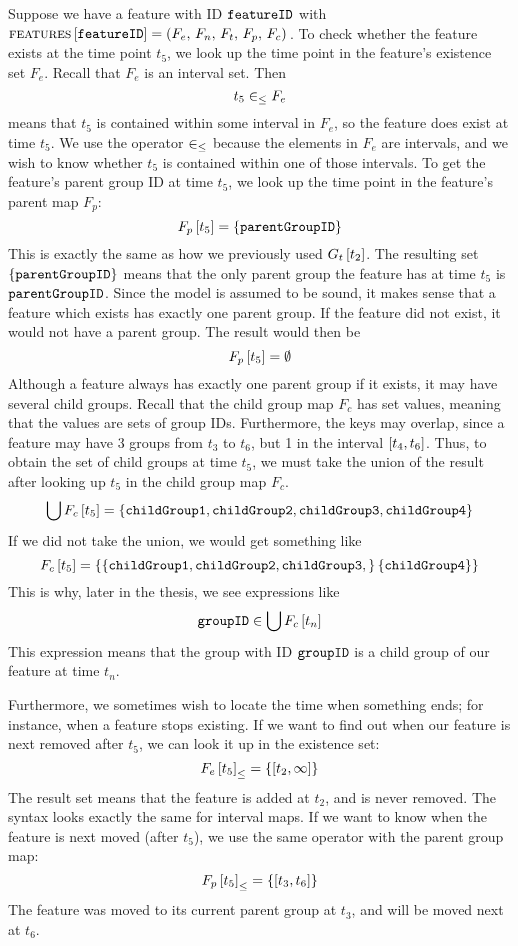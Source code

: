 Suppose we have a feature with ID $\texttt{featureID}$ with $\textsc{features} \left[ \texttt{featureID} \right] = \left(F_e,\, F_n,\, F_t,\, F_p,\, F_c\right){}$. To check whether the feature exists at the time point $t_5$, we look up the time point in the feature's existence set $F_e$. Recall that $F_e$ is an interval set. Then
\[
  t_5 \in_\leq F_e
\]
means that $t_5$ is contained within some interval in $F_e$, so the feature does exist at time $t_5$. We use the operator $\in_\leq$ because the elements in $F_e$ are intervals, and we wish to know whether $t_5$ is contained within one of those intervals. To get the feature's parent group ID at time $t_5$, we look up the time point in the feature's parent map $F_p$:
\[
  F_p \left[ t_5 \right] = \left\{\texttt{parentGroupID}\right\}
\]
This is exactly the same as how we previously used $G_t \left[ t_2 \right]$. The resulting set $\left\{\texttt{parentGroupID}\right\}$ means that the only parent group the feature has at time $t_5$ is $\texttt{parentGroupID}$. Since the model is assumed to be sound, it makes sense that a feature which exists has exactly one parent group. If the feature did not exist, it would not have a parent group. The result would then be
\[
  F_p \left[ t_5 \right] = \emptyset
\]
Although a feature always has exactly one parent group if it exists, it may have several child groups. Recall that the child group map $F_c$ has set values, meaning that the values are sets of group IDs. Furthermore, the keys may overlap, since a feature may have 3 groups from $t_3$ to $t_6$, but 1 in the interval $\interval{t_4}{t_6}$. Thus, to obtain the set of child groups at time $t_5$, we must take the union of the result after looking up $t_5$ in the child group map $F_c$.
\[
  \bigcup{F_c \left[ t_5 \right]} = \left\{\texttt{childGroup1}, \texttt{childGroup2}, \texttt{childGroup3}, \texttt{childGroup4}\right\}
\]
If we did not take the union, we would get something like
\[
  F_c \left[ t_5 \right] = \left\{\left\{\texttt{childGroup1}, \texttt{childGroup2}, \texttt{childGroup3},\right\} \left\{\texttt{childGroup4}\right\}\right\}
\]
This is why, later in the thesis, we see expressions like
\[
  \texttt{groupID} \in \bigcup{F_c \left[ t_n \right]}
\]
This expression means that the group with ID $\texttt{groupID}$ is a child group of our feature at time $t_n$.

Furthermore, we sometimes wish to locate the time when something ends; for instance, when a feature stops existing. If we want to find out when our feature is next removed after $t_5$, we can look it up in the existence set:
\[
  \containing{F_e}{t_5} = \set{\interval{t_2}{\forever}}
\]
The result set means that the feature is added at $t_2$, and is never removed. The syntax looks exactly the same for interval maps. If we want to know when the feature is next moved (after $t_5$), we use the same operator with the parent group map:
\[
  \containing{F_p}{t_5} = \set{\interval{t_3}{t_6}}
\]
The feature was moved to its current parent group at $t_3$, and will be moved next at $t_6$.

